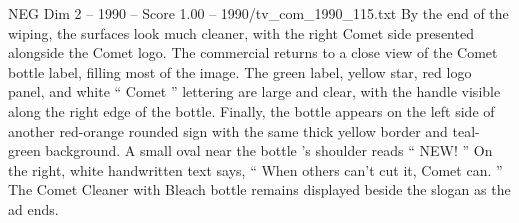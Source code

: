 \begin{textsample}{NEG Dim 2 – 1990 – Score 1.00 – 1990/tv\_com\_1990\_115.txt}
By the end of the wiping, the surfaces look much cleaner, with the right Comet side presented alongside the Comet logo.
The commercial returns to a close view of the Comet bottle label, filling most of the image.
The green label, yellow star, red logo panel, and white “ Comet ” lettering are large and clear, with the handle visible along the right edge of the bottle.
Finally, the bottle appears on the left side of another red-orange rounded sign with the same thick yellow border and teal-green background.
A small oval near the bottle ’s shoulder reads “ NEW! ” On the right, white handwritten text says, “ When others can't cut it, Comet can. ” The Comet Cleaner with Bleach bottle remains displayed beside the slogan as the ad ends.

\end{textsample}
